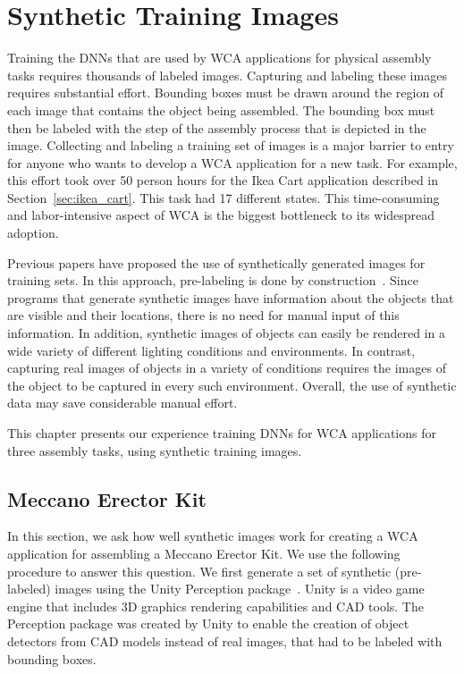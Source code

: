 \chapter{Synthetic Training Images}\label{chap:synthetic}

Training the DNNs that are used by WCA applications for physical assembly tasks
requires thousands of labeled images.
Capturing and labeling these images requires substantial effort.
Bounding boxes must be drawn around the region of each image that
contains the object being assembled.  The bounding box must then be
labeled with the step of the assembly process that is depicted in the
image.  Collecting and labeling a training set of images is a major
barrier to entry for anyone who wants to develop a WCA application for
a new task.
For example, this effort took over 50 person hours for the Ikea Cart application
described in Section~\ref{sec:ikea_cart}.
This task had 17 different states.
This time-consuming and labor-intensive
aspect of WCA is the biggest bottleneck to its widespread adoption.

Previous papers have proposed the use of synthetically generated
images for training sets.  In this approach, pre-labeling is done by
construction~\cite{synthetic_data, DBLP:journals/corr/abs-1809-10790,
  photo2, real_background1, real_background2, real_background3,
  dwibedi}.  Since programs that generate synthetic images have
information about the objects that are visible and their locations,
there is no need for manual input of this information.  In addition,
synthetic images of objects can easily be rendered in a wide variety
of different lighting conditions and environments.  In contrast,
capturing real images of objects in a variety of conditions requires
the images of the object to be captured in every such environment.
Overall, the use of synthetic data may save considerable manual
effort.

This chapter presents our experience training DNNs for WCA applications for
three assembly tasks, using synthetic training images.

\section{Meccano Erector Kit}

In this section, we ask how well synthetic images work for creating a WCA
application for assembling a Meccano Erector Kit.
We use the following procedure to answer this
question.  We first generate a set of synthetic (pre-labeled) images
using the Unity Perception package~\cite{unity}.
Unity is a video game engine that includes 3D graphics rendering capabilities
and CAD tools.
The Perception package was created by Unity to enable the creation of object
detectors from CAD models instead of real images, that had to be labeled with
bounding boxes.

